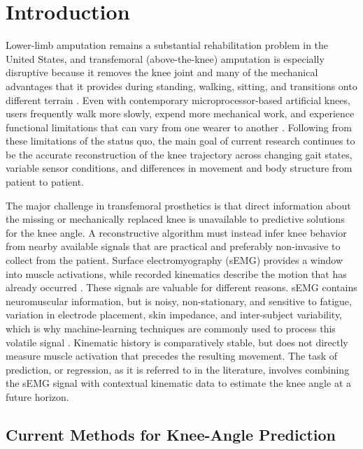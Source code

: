 \documentclass[referee,lineno,pdflatex,sn-vancouver-num]{sn-jnl}
\begin{document}
\maketitle

\section{Introduction}\label{sec:introduction}

Lower-limb amputation remains a substantial rehabilitation problem in the United States, and transfemoral (above-the-knee) amputation is especially disruptive because it removes the knee joint and many of the mechanical advantages that it provides during standing, walking, sitting, and transitions onto different terrain \cite{dillingham2002}. Even with contemporary microprocessor-based artificial knees, users frequently walk more slowly, expend more mechanical work, and experience functional limitations that can vary from one wearer to another \cite{pinhey2022}. Following from these limitations of the status quo, the main goal of current research continues to be the accurate reconstruction of the knee trajectory across changing gait states, variable sensor conditions, and differences in movement and body structure from patient to patient.

The major challenge in transfemoral prosthetics is that direct information about the missing or mechanically replaced knee is unavailable to predictive solutions for the knee angle. A reconstructive algorithm must instead infer knee behavior from nearby available signals that are practical and preferably non-invasive to collect from the patient. Surface electromyography (sEMG) provides a window into muscle activations, while recorded kinematics describe the motion that has already occurred \cite{deluca1997,farina2014}. These signals are valuable for different reasons. sEMG contains neuromuscular information, but is noisy, non-stationary, and sensitive to fatigue, variation in electrode placement, skin impedance, and inter-subject variability, which is why machine-learning techniques are commonly used to process this volatile signal \cite{chowdhury2013,phinyomark2018}. Kinematic history is comparatively stable, but does not directly measure muscle activation that precedes the resulting movement. The task of prediction, or regression, as it is referred to in the literature, involves combining the sEMG signal with contextual kinematic data to estimate the knee angle at a future horizon.

\subsection{Current Methods for Knee-Angle Prediction}
\end{document}
